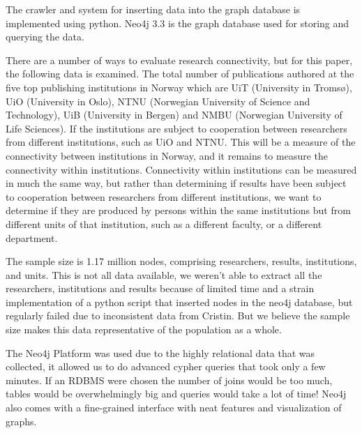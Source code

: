 The crawler and system for inserting data into the graph database is implemented using python.
Neo4j 3.3 is the graph database used for storing and querying the data.


There are a number of ways to evaluate research connectivity, but for this paper, the following data is examined.
The total number of publications authored at the five top publishing institutions in Norway which are UiT (University in Tromsø), UiO (University in Oslo), NTNU (Norwegian University of Science and Technology), UiB (University in Bergen) and NMBU (Norwegian University of Life Sciences). If the institutions are subject to cooperation between researchers from different institutions, such as UiO and NTNU.
This will be a measure of the connectivity between institutions in Norway, and it remains to measure the connectivity within institutions.
Connectivity within institutions can be measured in much the same way, but rather than determining if results have been subject to cooperation between researchers from different institutions, we want to determine if they are produced by persons within the same institutions but from different units of that institution, such as a different faculty, or a different department.

The sample size is 1.17 million nodes, comprising researchers, results, institutions, and units. This is not all data available, we weren't able to extract all the researchers, institutions and results because of limited time and a strain implementation of a python script that inserted nodes in the neo4j database, but regularly failed due to inconsistent data from Cristin. But we believe the sample size makes this data representative of the population as a whole.

The Neo4j Platform was used due to the highly relational data that was collected, it allowed us to do advanced cypher queries that took only a few minutes. If an RDBMS were chosen the number of joins would be too much, tables would be overwhelmingly big and queries would take a lot of time! Neo4j also comes with a fine-grained interface with neat features and visualization of graphs.
